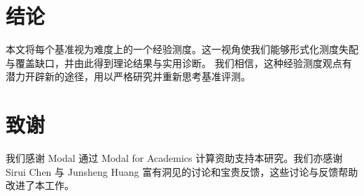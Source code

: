 \section{结论}

本文将每个基准视为难度上的一个经验测度。这一视角使我们能够形式化测度失配与覆盖缺口，并由此得到理论结果与实用诊断。
我们相信，这种经验测度观点有潜力开辟新的途径，用以严格研究并重新思考基准评测。



\section*{致谢}
我们感谢 Modal 通过 Modal for Academics 计算资助支持本研究。我们亦感谢 Sirui Chen 与 Junsheng Huang 富有洞见的讨论和宝贵反馈，这些讨论与反馈帮助改进了本工作。
